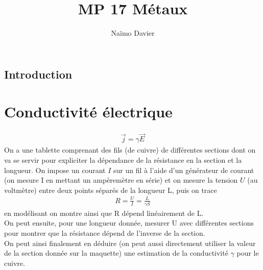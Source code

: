 \documentclass[12pt,prb,aps,epsf]{article}
\begin{document}
	
	\title{MP 17 Métaux}
	\author{Naïmo Davier}
	
	\maketitle
	
	\tableofcontents
	
	\pagebreak
	
	
\subsection{Introduction}

\section{Conductivité électrique}
\begin{eqnarray}
\vec{j} = \gamma \vec{E}
\end{eqnarray}
On a une tablette comprenant des fils (de cuivre) de différentes sections dont on va se servir pour expliciter la dépendance de la résistance en la section et la longueur.
On impose un courant $I$ sur un fil à l'aide d'un générateur de courant (on mesure I en mettant un ampèremètre en série) et on mesure la tension $U$ (au voltmètre) entre deux points séparés de la longueur L, puis on trace 
\begin{eqnarray}
R = \frac{U}{I} = \frac{L}{\gamma S}
\end{eqnarray}
en modélisant on montre ainsi que R dépend linéairement de L.\\

On peut ensuite, pour une longueur donnée, mesurer U avec différentes sections pour montrer que la résistance dépend de l'inverse de la section.\\

On peut ainsi finalement en déduire (on peut aussi directement utiliser la valeur de la section donnée sur la maquette) une estimation de la conductivité $\gamma$ pour le cuivre.
\end{document}
